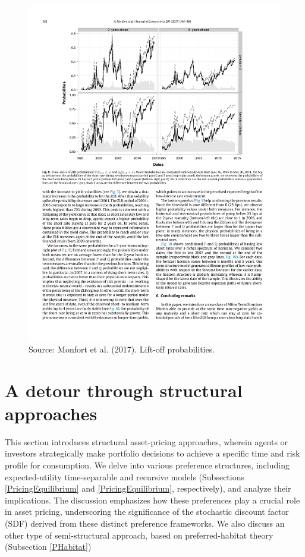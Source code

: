 \documentclass[
  12pt,
]{book}
\theoremstyle{definition}
\theoremstyle{definition}
\theoremstyle{definition}
\theoremstyle{definition}
\theoremstyle{remark}
\begin{document}
\begin{figure}

{\centering \includegraphics[width=0.95\linewidth]{figures/Figure_LiftOff} 

}

\caption{Source: Monfort et al. (2017). Lift-off probabilities.}\label{fig:liftOff}
\end{figure}

\hypertarget{Structural}{%
\chapter{A detour through structural approaches}\label{Structural}}

This section introduces structural asset-pricing approaches, wherein agents or investors strategically make portfolio decisions to achieve a specific time and risk profile for consumption. We delve into various preference structures, including expected-utility time-separable and recursive models (Subsections \ref{PricingEquilibrium} and \ref{PricingEquilibrium}, respectively), and analyze their implications. The discussion emphasizes how these preferences play a crucial role in asset pricing, underscoring the significance of the stochastic discount factor (SDF) derived from these distinct preference frameworks. We also discuss an other type of semi-structural approach, based on preferred-habitat theory (Subsection \ref{PHabitat})
\end{document}
